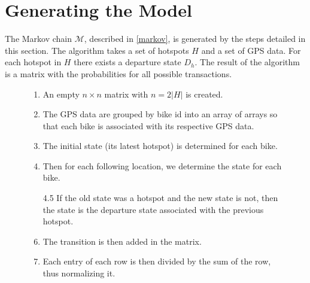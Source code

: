 \section{Generating the Model}\label{sec:generatemarkov}
The Markov chain $\mathcal{M}$, described in \cref{markov}, is generated by the steps detailed in this section.
The algorithm takes a set of hotspots $H$ and a set of GPS data. For each hotspot in $H$ there exists a departure state $D_h$.
The result of the algorithm is a matrix with the probabilities for all possible transactions.

\begin{figure}
\begin{enumerate}
\item An empty $n \times n$ matrix with $n = 2|H|$ is created.
\item The GPS data are grouped by bike id into an array of arrays so that each bike is associated with its respective GPS data.
\item The initial state (its latest hotspot) is determined for each bike.
\item Then for each following location, we determine the state for each bike.
\item[4.5] If the old state was a hotspot and the new state is not, then the state is the departure state associated with the previous hotspot.
\item The transition is then added in the matrix.
\item Each entry of each row is then divided by the sum of the row, thus normalizing it.
\end{enumerate}
\label{enum:markov}
\end{figure}
